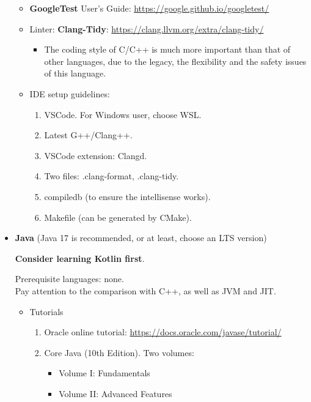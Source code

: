 \documentclass{article}
\begin{document}
\begin{itemize}
\begin{itemize}
        \item \textbf{GoogleTest} User’s Guide:
        \href{https://google.github.io/googletest/}{https://google.github.io/googletest/}
        \item Linter: \textbf{Clang-Tidy}:
        \href{https://clang.llvm.org/extra/clang-tidy/}{https://clang.llvm.org/extra/clang-tidy/}
        \begin{itemize}
            \item The coding style of C/C++ is much more important than that of other languages, due to the legacy, the flexibility and the safety issues of this language.
        \end{itemize}
        \item IDE setup guidelines:
        \begin{enumerate}
            \item VSCode. For Windows user, choose WSL.
            \item Latest G++/Clang++.
            \item VSCode extension: Clangd.
            \item Two files: .clang-format, .clang-tidy.
            \item compiledb (to ensure the intellisense works).
            \item Makefile (can be generated by CMake).
        \end{enumerate}
    \end{itemize}
    
    
    \item \textbf{Java} (Java 17 is recommended, or at least, choose an LTS version)
    
    \textbf{Consider learning Kotlin first}.
    
    Prerequisite languages: none.\\
    Pay attention to the comparison with C++, as well as JVM and JIT.
    \begin{itemize}
        \item Tutorials
        \begin{enumerate}
            \item Oracle online tutorial:
        \href{https://docs.oracle.com/javase/tutorial/}{https://docs.oracle.com/javase/tutorial/}
            \item Core Java (10th Edition). Two volumes:
            \begin{itemize}
                \item Volume I: Fundamentals \cite{gvero2013core1}
                \item Volume II: Advanced Features \cite{tarimci2014core2}
            \end{itemize}


\end{enumerate}
\end{itemize}
\end{itemize}
\end{document}
